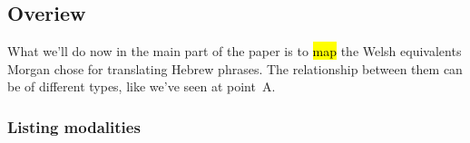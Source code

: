 \setcounter{subsection}{-1}
\subsection[Overview]{Overiew}

\begin{paper}


	What we’ll do now in the main part of the paper is to \hl{map} the Welsh equivalents Morgan chose for translating Hebrew phrases. The relationship between them can be of different types, like we’ve seen at point~A.

\end{paper}




\subsubsection{Listing modalities}

